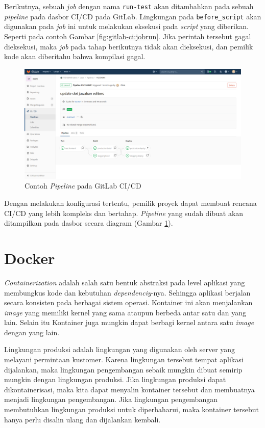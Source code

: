     Berikutnya, sebuah \textit{job} dengan nama \texttt{run-test} akan ditambahkan pada sebuah \textit{pipeline} pada dasbor CI/CD pada GitLab. Lingkungan pada \texttt{before\_script} akan digunakan pada \textit{job} ini untuk melakukan eksekusi pada \textit{script} yang diberikan. Seperti pada contoh Gambar \ref{fig:gitlab-ci:jobrun}. 
    Jika perintah tersebut gagal dieksekusi, maka \textit{job} pada tahap berikutnya tidak akan dieksekusi, dan pemilik kode akan diberitahu bahwa kompilasi gagal.
    
    
    \begin{figure}
        \centering
        \includegraphics[width=0.7\paperwidth]{Gambar/gitlab-ci-pipeline.png}
        \caption{Contoh \textit{Pipeline} pada GitLab CI/CD}
        \label{fig:gitlab-ci:pipeline}
    \end{figure}
    
    Dengan melakukan konfigurasi tertentu, pemilik proyek dapat membuat rencana CI/CD yang lebih kompleks dan bertahap. \textit{Pipeline} yang sudah dibuat akan ditampilkan pada dasbor secara diagram (Gambar \ref{fig:gitlab-ci:pipeline}).

\section{Docker}
    \textit{Containerization} adalah salah satu bentuk abstraksi pada level aplikasi yang membungkus kode dan kebutuhan \textit{dependenciy}-nya. Sehingga aplikasi berjalan secara konsisten pada berbagai sistem operasi\cite{docker:what-is-container}. Kontainer ini akan menjalankan \textit{image} yang memiliki kernel yang sama ataupun berbeda antar satu dan yang lain. Selain itu Kontainer juga mungkin dapat berbagi kernel antara satu \textit{image} dengan yang lain.
    
    Lingkungan produksi adalah lingkungan yang digunakan oleh server yang melayani permintaan kustomer. Karena lingkungan tersebut tempat aplikasi dijalankan, maka lingkungan pengembangan sebaik mungkin dibuat semirip mungkin dengan lingkungan produksi. Jika lingkungan produksi dapat dikontainerisasi, maka kita dapat menyalin kontainer tersebut dan membuatnya menjadi lingkungan pengembangan.
    Jika lingkungan pengembangan membutuhkan lingkungan produksi untuk diperbaharui, maka kontainer tersebut hanya perlu disalin ulang dan dijalankan kembali.
    
